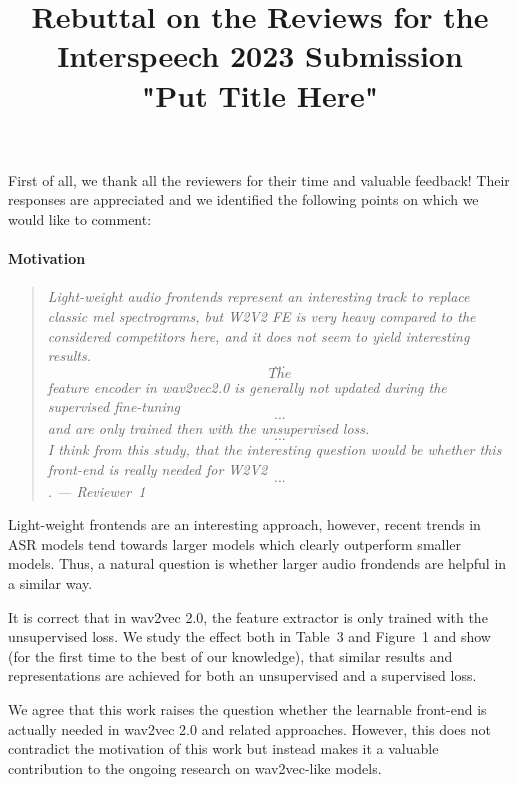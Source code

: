 \documentclass[11pt]{extarticle}
\title{Rebuttal on the Reviews for the Interspeech 2023 Submission \\ "Put Title Here"}
\date{}
\begin{document}
\maketitle\vspace{-10mm}
First of all, we thank all the reviewers for their time and valuable feedback! Their responses are appreciated and we identified the following points on which we would like to comment:

\paragraph{Motivation}
\begin{quote}\textit{
Light-weight audio frontends represent an interesting track to replace classic mel spectrograms, but W2V2 FE is very heavy compared to the considered competitors here, and it does not seem to yield interesting results.
\[...\]
\[The\] feature encoder in wav2vec2.0 is generally not updated during the supervised fine-tuning \[...\] and are only trained then with the unsupervised loss.
\[...\]
I think from this study, that the interesting question would be whether this front-end is really needed for W2V2 \[...\].
--- Reviewer~1
}\end{quote}
Light-weight frontends are an interesting approach, however, recent trends in ASR models tend towards larger models which clearly outperform smaller models.
Thus, a natural question is whether larger audio frondends are helpful in a similar way.

It is correct that in wav2vec 2.0, the feature extractor is only trained with the unsupervised loss.
We study the effect both in Table~3 and Figure~1 and show (for the first time to the best of our knowledge), that similar results and representations are achieved for both an unsupervised and a supervised loss.

We agree that this work raises the question whether the learnable front-end is actually needed in wav2vec 2.0 and related approaches.
However, this does not contradict the motivation of this work but instead makes it a valuable contribution to the ongoing research on wav2vec-like models.
\end{document}
